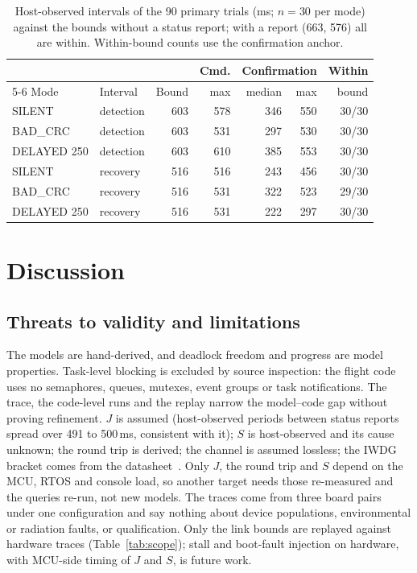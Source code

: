\documentclass[conference,a4paper]{IEEEtran}
\newif\ifrerunmarks
\DeclareRobustCommand{\rerun}[1]{\ifrerunmarks\textcolor{red}{#1}\else#1\fi}
\begin{document}
\begin{table}[t]
\centering\footnotesize
\caption{Host-observed intervals of the 90 primary trials (ms; $n=30$ per mode) against the bounds without a status report; \rerun{with a report (663, 576) all are within}. Within-bound counts use the confirmation anchor.}
\label{tab:desc}
\setlength{\tabcolsep}{3.5pt}
\begin{tabular}{@{}llrrrrr@{}}
\toprule
& & & Cmd. & \multicolumn{2}{c}{Confirmation} & Within \\
\cmidrule(lr){5-6}
Mode & Interval & Bound & max & median & max & bound \\
\midrule
SILENT      & detection & \rerun{603} & 578 & 346 & 550 & \rerun{30/30} \\
BAD\_CRC    & detection & \rerun{603} & 531 & 297 & 530 & \rerun{30/30} \\
DELAYED 250 & detection & \rerun{603} & 610 & 385 & 553 & \rerun{30/30} \\
SILENT      & recovery  & \rerun{516} & 516 & 243 & 456 & \rerun{30/30} \\
BAD\_CRC    & recovery  & \rerun{516} & 531 & 322 & \rerun{523} & \rerun{29/30} \\
DELAYED 250 & recovery  & \rerun{516} & 531 & 222 & 297 & \rerun{30/30} \\
\bottomrule
\end{tabular}
\end{table}

\section{Discussion}
\label{sec:discussion}
\subsection{Threats to validity and limitations}
The models are hand-derived, and deadlock freedom and progress are model properties. Task-level blocking is excluded by source inspection: the flight code uses no semaphores, queues, mutexes, event groups or task notifications. The trace, the code-level runs and the replay narrow the model--code gap without proving refinement. \rerun{$J$ is assumed (host-observed periods between status reports spread over 491 to 500\,ms, consistent with it); $S$ is host-observed and its cause unknown; the round trip is derived}; the channel is assumed lossless; the IWDG bracket comes from the datasheet~\cite{st2021ds12589}. Only $J$, the round trip and $S$ depend on the MCU, RTOS and console load, so another target needs those re-measured and the queries re-run, not new models. The traces come from three board pairs under one configuration and say nothing about device populations, environmental or radiation faults, or qualification. \rerun{Only the link bounds are replayed against hardware traces (Table~\ref{tab:scope}); stall and boot-fault injection on hardware, with MCU-side timing of $J$ and $S$, is future work.}
\end{document}
